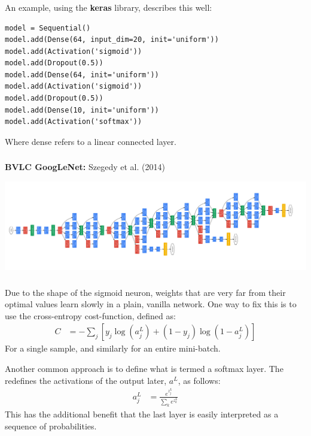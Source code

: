 \documentclass[xetex,mathserif,serif,aspectratio=169]{beamer}
\begin{document}
\begin{frame}[fragile] \frametitle{} \oldB \small

\textbf{}

An example, using the \textbf{keras} library, describes this
well:
\begin{verbatim}
model = Sequential()
model.add(Dense(64, input_dim=20, init='uniform'))
model.add(Activation('sigmoid'))
model.add(Dropout(0.5))
model.add(Dense(64, init='uniform'))
model.add(Activation('sigmoid'))
model.add(Dropout(0.5))
model.add(Dense(10, init='uniform'))
model.add(Activation('softmax'))
\end{verbatim}
Where dense refers to a linear connected layer.

\end{frame}


\begin{frame}[fragile] \frametitle{} \oldB \small

\textbf{BVLC GoogLeNet:} Szegedy et al. (2014)

\begin{center}
\includegraphics[width=\textwidth]{img/googlenet_diagram.png}
\end{center}

\end{frame}

\begin{frame}[fragile] \frametitle{} \oldB \small

\textbf{}

Due to the shape of the sigmoid neuron, weights that are very far from
their optimal values learn slowly in a plain, vanilla network. One way
to fix this is to use the cross-entropy cost-function, defined as:
\begin{align*}
C &= - \sum_j \left[ y_j \log(a_j^L) + (1-y_j) \log(1 - a_j^L) \right]
\end{align*}
For a single sample, and similarly for an entire mini-batch.

Another common approach is to define what is termed a softmax layer.
The redefines the activations of the output later, $a^L$, as follows:
\begin{align*}
a^L_j &= \frac{e^{z_j^L}}{\sum_k e^{z_k^L}}
\end{align*}
This has the additional benefit that the last layer is easily interpreted
as a sequence of probabilities.

\end{frame}
\end{document}
